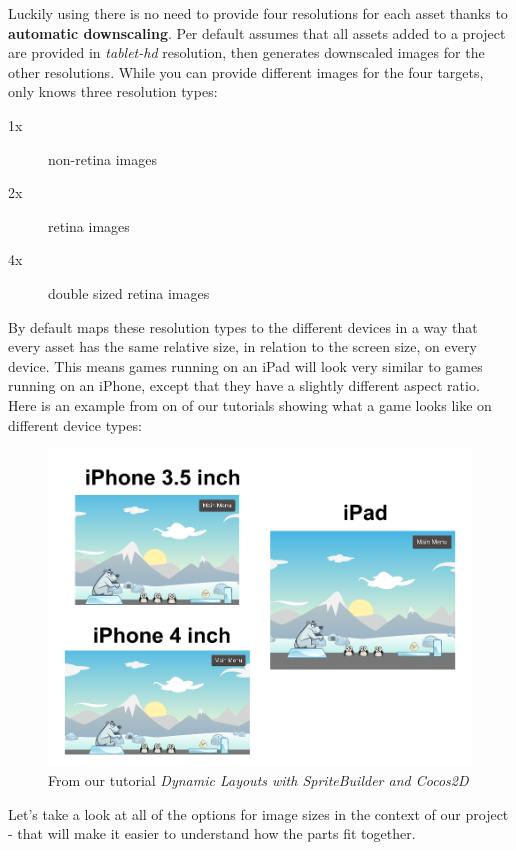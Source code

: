 Luckily using \SB{} there is no need to provide four resolutions for each asset
thanks to \textbf{automatic downscaling}.
Per default \SB{} assumes that all assets added to a project are provided in \textit{tablet-hd} resolution, then
\SB{} generates downscaled images for the other resolutions. While you can
provide different images for the four targets, \SB{} only knows three resolution
types:
\begin{description}
\item[1x] non-retina images
\item[2x] retina images
\item[4x] double sized retina images
\end{description}

By default \SB{} maps these resolution types to the different devices in a way
that every asset has the same relative size, in relation to the screen size, on
every device. This means games running on an iPad will look very similar to games
running on an iPhone, except that they have a slightly different aspect ratio.
Here is an example from on of our tutorials showing what a game looks like on
different device types:

\begin{figure}[H]
		\centering
		\includegraphics[width=0.9\linewidth]{images/Chapter2/ResultsFlexibleScaleMode.png}
		\caption{From our tutorial \textit{Dynamic Layouts with SpriteBuilder and
		Cocos2D}}
\end{figure}

Let's take a look at all of the options for image sizes in the context of our
\SB{} project - that will make it easier to understand how the parts fit
together.

